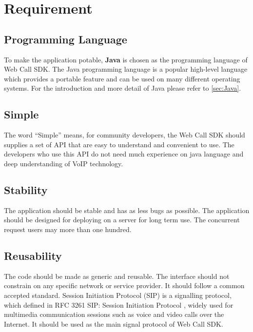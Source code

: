 \chapter{Requirement}
\label{sec:Requirement}


\section{Programming Language}
\label{sec:Requirement:ProgrammingLanguage}

To make the application potable, \textbf{Java} is chosen as the programming language of Web Call SDK. The Java programming language is a popular high-level language which provides a portable feature and can be used on many different operating systems. For the introduction and more detail of Java please refer to \ref{sec:Java}.

\section{Simple}
\label{sec:Requirement:Simple}

The word ``Simple'' means, for community developers, the Web Call SDK should supplies a set of API that are easy to understand and convenient to use. The developers who use this API do not need much experience on java language and deep understanding of VoIP technology.

\section{Stability}
\label{sec:Requirement:Stability}

The application should be stable and has as less bugs as possible. The application should be designed for deploying on a server for long term use. The concurrent request users may more than one hundred. 

\section{Reusability}
\label{sec:Requirement:Reusability}

The code should be made as generic and reusable. The interface should not constrain on any specific network or service provider. It should follow a common accepted standard. Session Initiation Protocol (SIP) is a signalling protocol, which defined in RFC 3261 SIP: Session Initiation Protocol \cite{RFC3261}, widely used for multimedia communication sessions such as voice and video calls over the Internet. It should be used as the main signal protocol of Web Call SDK.

